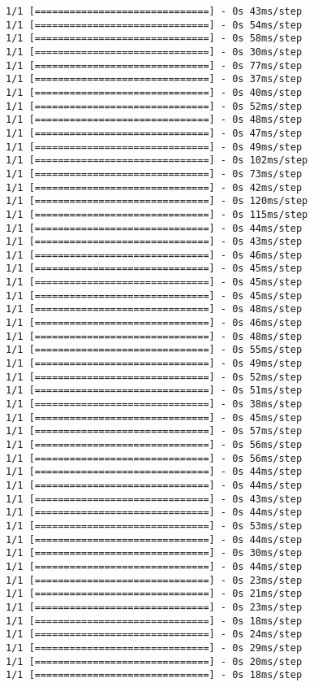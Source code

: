 \documentclass[11pt]{article}
\begin{document}
\begin{Verbatim}[commandchars=\\\{\}]
1/1 [==============================] - 0s 43ms/step
1/1 [==============================] - 0s 54ms/step
1/1 [==============================] - 0s 58ms/step
1/1 [==============================] - 0s 30ms/step
1/1 [==============================] - 0s 77ms/step
1/1 [==============================] - 0s 37ms/step
1/1 [==============================] - 0s 40ms/step
1/1 [==============================] - 0s 52ms/step
1/1 [==============================] - 0s 48ms/step
1/1 [==============================] - 0s 47ms/step
1/1 [==============================] - 0s 49ms/step
1/1 [==============================] - 0s 102ms/step
1/1 [==============================] - 0s 73ms/step
1/1 [==============================] - 0s 42ms/step
1/1 [==============================] - 0s 120ms/step
1/1 [==============================] - 0s 115ms/step
1/1 [==============================] - 0s 44ms/step
1/1 [==============================] - 0s 43ms/step
1/1 [==============================] - 0s 46ms/step
1/1 [==============================] - 0s 45ms/step
1/1 [==============================] - 0s 45ms/step
1/1 [==============================] - 0s 45ms/step
1/1 [==============================] - 0s 48ms/step
1/1 [==============================] - 0s 46ms/step
1/1 [==============================] - 0s 48ms/step
1/1 [==============================] - 0s 55ms/step
1/1 [==============================] - 0s 49ms/step
1/1 [==============================] - 0s 52ms/step
1/1 [==============================] - 0s 51ms/step
1/1 [==============================] - 0s 38ms/step
1/1 [==============================] - 0s 45ms/step
1/1 [==============================] - 0s 57ms/step
1/1 [==============================] - 0s 56ms/step
1/1 [==============================] - 0s 56ms/step
1/1 [==============================] - 0s 44ms/step
1/1 [==============================] - 0s 44ms/step
1/1 [==============================] - 0s 43ms/step
1/1 [==============================] - 0s 44ms/step
1/1 [==============================] - 0s 53ms/step
1/1 [==============================] - 0s 44ms/step
1/1 [==============================] - 0s 30ms/step
1/1 [==============================] - 0s 44ms/step
1/1 [==============================] - 0s 23ms/step
1/1 [==============================] - 0s 21ms/step
1/1 [==============================] - 0s 23ms/step
1/1 [==============================] - 0s 18ms/step
1/1 [==============================] - 0s 24ms/step
1/1 [==============================] - 0s 29ms/step
1/1 [==============================] - 0s 20ms/step
1/1 [==============================] - 0s 18ms/step

\end{Verbatim}
\end{document}
